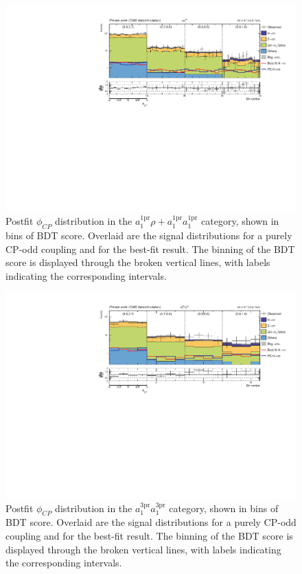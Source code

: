 \begin{figure}[!htbp]
    \centering
    \includegraphics[width=1\textwidth]{Figures/Chapter7/postfit/htt_tt_4_13p6TeV.pdf}
    \caption[Postfit $\phi_{CP}$ distribution in the $a_1^\text{1pr}\rho + a_1^\text{1pr}a_1^\text{1pr}$ category.]
    {Postfit $\phi_{CP}$ distribution in the $a_1^\text{1pr}\rho + a_1^\text{1pr}a_1^\text{1pr}$ category, shown in bins of \ac{BDT} score. Overlaid are the signal distributions for a purely CP-odd coupling and for the best-fit result. The binning of the BDT score is displayed through the broken vertical lines, with labels indicating the corresponding intervals.}
    \label{Figure:Chapter7_Postfit_Unrolled_6}
\end{figure}

\begin{figure}[!htbp]
    \centering
    \includegraphics[width=1\textwidth]{Figures/Chapter7/postfit/htt_tt_6_13p6TeV.pdf}
    \caption[Postfit $\phi_{CP}$ distribution in the $a_1^\text{3pr}a_1^\text{3pr}$ category.]
    {Postfit $\phi_{CP}$ distribution in the $a_1^\text{3pr}a_1^\text{3pr}$ category, shown in bins of \ac{BDT} score. Overlaid are the signal distributions for a purely CP-odd coupling and for the best-fit result. The binning of the BDT score is displayed through the broken vertical lines, with labels indicating the corresponding intervals.}
    \label{Figure:Chapter7_Postfit_Unrolled_7}
\end{figure}

